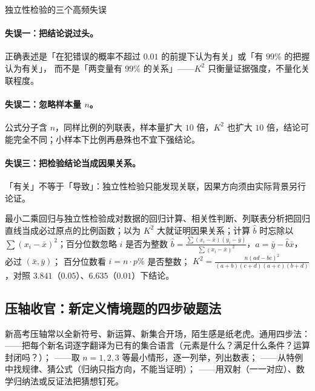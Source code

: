 \begin{explore}
\begin{commonerror}{独立性检验的三个高频失误}
\paragraph{失误一：把结论说过头。}
正确表述是「在犯错误的概率不超过 $0.01$ 的前提下认为有关」或「有 $99\%$ 的把握认为有关」，
而不是「两变量有 $99\%$ 的关系」——$K^2$ 只衡量证据强度，不量化关联程度。
\paragraph{失误二：忽略样本量 $n$。}
公式分子含 $n$，同样比例的列联表，样本量扩大 $10$ 倍，$K^2$ 也扩大 $10$ 倍，结论可能完全不同；小样本下比例再悬殊也不宜下强结论。
\paragraph{失误三：把检验结论当成因果关系。}
「有关」不等于「导致」：独立性检验只能发现关联，因果方向须由实际背景另行论证。
\end{commonerror}

\begin{conccard}[一级]{最小二乘回归与独立性检验}{成对数据的回归计算、相关性判断、列联表分析}{把回归直线当成必过原点的比例函数；以为 $K^2$ 大就证明因果关系；计算 $\hat b$ 时忘除以 $\sum(x_i-\bar x)^2$；百分位数忽略 $i$ 是否为整数}
$\hat b=\frac{\sum(x_i-\bar x)(y_i-\bar y)}{\sum(x_i-\bar x)^2}$，$\hat a=\bar y-\hat b\bar x$，必过 $(\bar x,\bar y)$；
百分位数看 $i=n\cdot p\%$ 是否整数；
$K^2=\frac{n(ad-bc)^2}{(a+b)(c+d)(a+c)(b+d)}$，对照 $3.841$（$0.05$）、$6.635$（$0.01$）下结论。
\end{conccard}

\subsection{压轴收官：新定义情境题的四步破题法}


新高考压轴常以全新符号、新运算、新集合开场，陌生感是纸老虎。通用四步法：
——把每个新名词逐字翻译为已有的集合语言（元素是什么？满足什么条件？运算封闭吗？）；
——取 $n=1,2,3$ 等最小情形，逐一列举，列出数表；
——从特例中找规律、猜公式（归纳只指方向，不能当证明）；
——用双射（一一对应）、数学归纳法或反证法把猜想钉死。


\end{explore}
